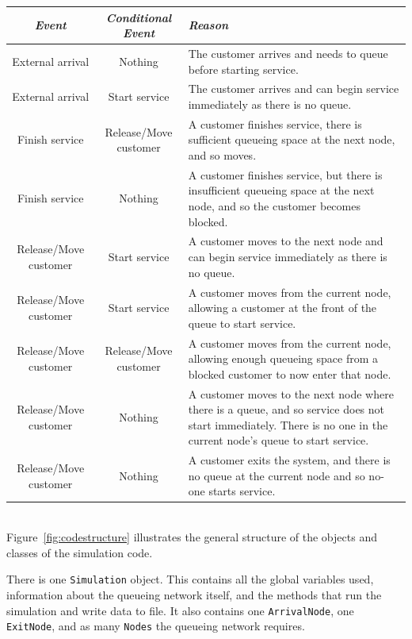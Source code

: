 \documentclass{article}
\begin{document}
\begin{tabular}{ | c | c | p{7.8cm} | }
    \hline
    \textbf{\textit{Event}} & \textbf{\textit{Conditional Event}} & \textbf{\textit{Reason}} \\
    \hline
    External arrival & Nothing & The customer arrives and needs to queue before starting service. \\
    \hline
    External arrival & Start service & The customer arrives and can begin service immediately as there is no queue. \\
    \hline
    Finish service & Release/Move customer & A customer finishes service, there is sufficient queueing space at the next node, and so moves. \\
    \hline
    Finish service & Nothing & A customer finishes service, but there is insufficient queueing space at the next node, and so the customer becomes blocked. \\
    \hline
    Release/Move customer & Start service & A customer moves to the next node and can begin service immediately as there is no queue. \\
    \hline
    Release/Move customer & Start service & A customer moves from the current node, allowing a customer at the front of the queue to start service. \\
    \hline
    Release/Move customer & Release/Move customer & A customer moves from the current node, allowing enough queueing space from a blocked customer to now enter that node. \\
    \hline
    Release/Move customer & Nothing & A customer moves to the next node where there is a queue, and so service does not start immediately. There is no one in the current node's queue to start service. \\
    \hline
    Release/Move customer & Nothing & A customer exits the system, and there is no queue at the current node and so no-one starts service. \\
    \hline
\end{tabular}\\

Figure~\ref{fig:codestructure} illustrates the general structure of the objects and classes of the simulation code.

There is one \texttt{Simulation} object.
This contains all the global variables used, information about the queueing network itself, and the methods that run the simulation and write data to file.
It also contains one \texttt{ArrivalNode}, one \texttt{ExitNode}, and as many \texttt{Nodes} the queueing network requires.
\end{document}
